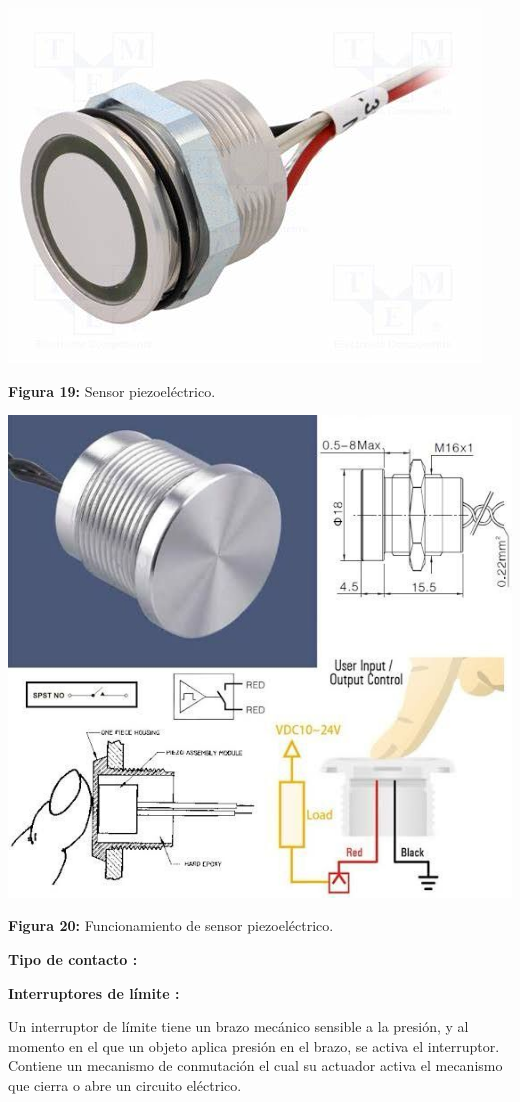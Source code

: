 \begin{center}
	\includegraphics[width=0.3\linewidth, height=0.2\textheight]{img/S}
	
	\vspace{2mm} %
	
	\textbf{Figura 19:} Sensor piezoeléctrico.
\end{center}

\vspace{5mm} %

\begin{center}
	\includegraphics[width=0.5\linewidth]{img/Spiezoelectrico}
	
	\vspace{2mm} %
	
	\textbf{Figura 20:} Funcionamiento de sensor piezoeléctrico.
\end{center}
\vspace{10mm}
\textbf{Tipo de contacto : }
\vspace{10mm}

\textbf{Interruptores de límite : }

Un interruptor de límite tiene un brazo mecánico sensible a la presión, y al momento  en el que un  objeto aplica presión en el brazo, se activa el interruptor.  Contiene un mecanismo de conmutación el cual su actuador activa el mecanismo que cierra o abre un circuito eléctrico. 
\vspace{5mm}

